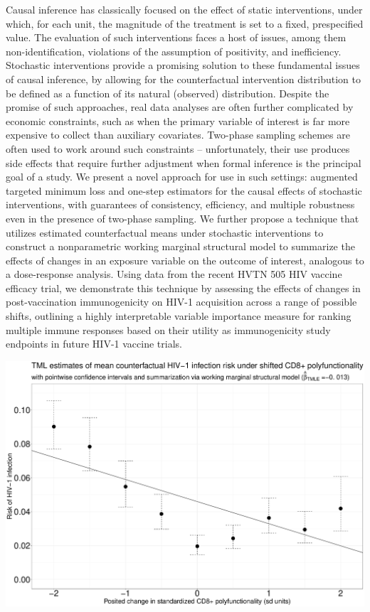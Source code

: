 \documentclass[]{elsarticle} %
\makeatletter
\def\maxwidth{\ifdim\Gin@nat@width>\linewidth\linewidth
\else\Gin@nat@width\fi}
\let\Oldincludegraphics\includegraphics
\renewcommand{\includegraphics}[1]{\Oldincludegraphics[width=\maxwidth]{#1}}
\makeatother
\begin{document}
Causal inference has classically focused on the effect of static
interventions, under which, for each unit, the magnitude of the
treatment is set to a fixed, prespecified value. The evaluation of such
interventions faces a host of issues, among them non-identification,
violations of the assumption of positivity, and inefficiency. Stochastic
interventions provide a promising solution to these fundamental issues
of causal inference, by allowing for the counterfactual intervention
distribution to be defined as a function of its natural (observed)
distribution. Despite the promise of such approaches, real data analyses
are often further complicated by economic constraints, such as when the
primary variable of interest is far more expensive to collect than
auxiliary covariates. Two-phase sampling schemes are often used to work
around such constraints -- unfortunately, their use produces side
effects that require further adjustment when formal inference is the
principal goal of a study. We present a novel approach for use in such
settings: augmented targeted minimum loss and one-step estimators for
the causal effects of stochastic interventions, with guarantees of
consistency, efficiency, and multiple robustness even in the presence of
two-phase sampling. We further propose a technique that utilizes
estimated counterfactual means under stochastic interventions to
construct a nonparametric working marginal structural model to summarize
the effects of changes in an exposure variable on the outcome of
interest, analogous to a dose-response analysis. Using data from the
recent HVTN 505 HIV vaccine efficacy trial, we demonstrate this
technique by assessing the effects of changes in post-vaccination
immunogenicity on HIV-1 acquisition across a range of possible shifts,
outlining a highly interpretable variable importance measure for ranking
multiple immune responses based on their utility as immunogenicity study
endpoints in future HIV-1 vaccine trials.

\newpage

\includegraphics{./cd8_msm_tmle_summary.pdf}
\end{document}
